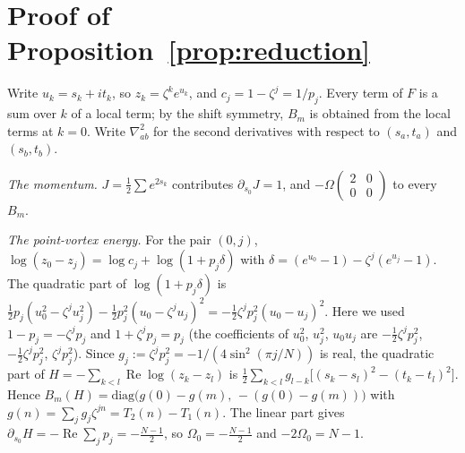 \documentclass[11pt]{article}
\theoremstyle{definition}
\theoremstyle{remark}
\newcommand{\re}{\operatorname{Re}}
\begin{document}
\appendix
\section{Proof of Proposition~\ref{prop:reduction}}\label{app:reduction}

Write $u_k=s_k+it_k$, so $z_k=\zeta^ke^{u_k}$, and $c_j=1-\zeta^j=1/p_j$. Every term of $F$ is a sum over $k$ of a local term;
by the shift symmetry, $B_m$ is obtained from the local terms at $k=0$. Write $\nabla^2_{ab}$ for the second derivatives with
respect to $(s_a,t_a)$ and $(s_b,t_b)$.

\emph{The momentum.} $J=\frac12\sum e^{2s_k}$ contributes $\partial_{s_0}J=1$, and $-\Omega\left(\begin{smallmatrix}2&0\\0&0\end{smallmatrix}\right)$ to every $B_m$.

\emph{The point-vortex energy.} For the pair $(0,j)$,
$\log(z_0-z_j)=\log c_j+\log(1+p_j\delta)$ with $\delta=(e^{u_0}-1)-\zeta^j(e^{u_j}-1)$. The quadratic part of
$\log(1+p_j\delta)$ is $\frac12p_j(u_0^2-\zeta^ju_j^2)-\frac12p_j^2(u_0-\zeta^ju_j)^2=-\frac12\zeta^jp_j^2(u_0-u_j)^2$. Here we
used $1-p_j=-\zeta^jp_j$ and $1+\zeta^jp_j=p_j$ (the coefficients of $u_0^2$, $u_j^2$, $u_0u_j$ are $-\frac12\zeta^jp_j^2$,
$-\frac12\zeta^jp_j^2$, $\zeta^jp_j^2$). Since $g_j:=\zeta^jp_j^2=-1/(4\sin^2(\pi j/N))$ is real, the quadratic part of
$H=-\sum_{k<l}\re\log(z_k-z_l)$ is $\frac12\sum_{k<l}g_{l-k}\big[(s_k-s_l)^2-(t_k-t_l)^2\big]$. Hence
$B_m(H)=\mathrm{diag}\big(g(0)-g(m),\,-(g(0)-g(m))\big)$ with $g(n)=\sum_jg_j\zeta^{jn}=T_2(n)-T_1(n)$. The linear part gives
$\partial_{s_0}H=-\re\sum_jp_j=-\frac{N-1}2$, so $\Omega_0=-\frac{N-1}2$ and $-2\Omega_0=N-1$.
\end{document}
